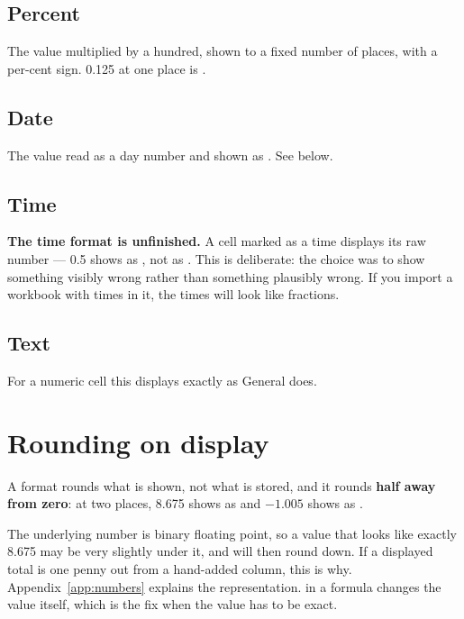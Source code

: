 \subsection{Percent}

The value multiplied by a hundred, shown to a fixed number of places, with a
per-cent sign. 0.125 at one place is .

\subsection{Date}

The value read as a day number and shown as . See below.

\subsection{Time}

\begin{ccnote}
\textbf{The time format is unfinished.} A cell marked as a time displays its raw
number --- 0.5 shows as , not as . This is deliberate:
the choice was to show something visibly wrong rather than something plausibly
wrong. If you import a workbook with times in it, the times will look like
fractions.
\end{ccnote}

\subsection{Text}

For a numeric cell this displays exactly as General does.

\section{Rounding on display}

A format rounds what is shown, not what is stored, and it rounds \textbf{half
away from zero}: at two places, 8.675 shows as  and $-1.005$ shows as
.

\begin{ccnote}
The underlying number is binary floating point, so a value that looks like
exactly 8.675 may be very slightly under it, and will then round down. If a
displayed total is one penny out from a hand-added column, this is why.
Appendix~\ref{app:numbers} explains the representation.  in a formula changes the
value itself, which is the fix when the value has to be exact.
\end{ccnote}

